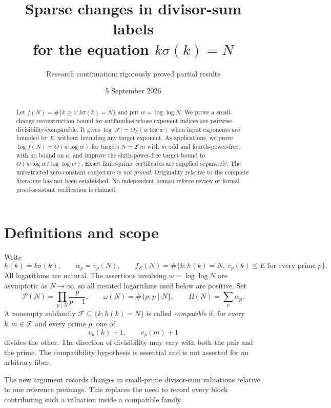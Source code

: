 \documentclass[11pt]{article}
\title{Sparse changes in divisor-sum labels\\for the equation \texorpdfstring{$k\sigma(k)=N$}{k sigma(k)=N}}
\author{Research continuation: rigorously proved partial results}
\date{5 September 2026}
\newcommand{\PP}{\mathcal P}
\newcommand{\FF}{\mathcal F}
\begin{document}
\maketitle
\begin{abstract}
Let $f(N)=\#\{k\ge1:k\sigma(k)=N\}$ and put $w=\log\log N$. We prove a small-change reconstruction bound for subfamilies whose exponent indices are pairwise divisibility-comparable. It gives $\log|\FF|=O_E(w\log w)$ when input exponents are bounded by $E$, without bounding any target exponent. As applications, we prove $\log f(N)=O(w\log w)$ for targets $N=2^a m$ with $m$ odd and fourth-power-free, with no bound on $a$, and improve the sixth-power-free target bound to $O(w\log w/\log\log w)$. Exact finite-prime certificates are supplied separately. The unrestricted zero-constant conjecture is \emph{not proved}. Originality relative to the complete literature has not been established. No independent human referee review or formal proof-assistant verification is claimed.
\end{abstract}

\section{Definitions and scope}
Write
\[
 h(k)=k\sigma(k),\qquad \alpha_p=v_p(N),\qquad
 f_E(N)=\#\{k:h(k)=N,\ v_p(k)\le E\text{ for every prime }p\}.
\]
All logarithms are natural. The assertions involving $w=\log\log N$ are asymptotic as $N\to\infty$, so all iterated logarithms used below are positive. Set
\[
 \PP(N)=\prod_{p\mid N}\frac{p}{p-1},\qquad
 \omega(N)=\#\{p:p\mid N\},\qquad \Omega(N)=\sum_p\alpha_p.
\]
A nonempty subfamily $\FF\subseteq\{k:h(k)=N\}$ is called \emph{compatible} if, for every $k,m\in\FF$ and every prime $p$, one of
\[
 v_p(k)+1,\qquad v_p(m)+1
\]
divides the other. The direction of divisibility may vary with both the pair and the prime. The compatibility hypothesis is essential and is not asserted for an arbitrary fiber.

The new argument records changes in small-prime divisor-sum valuations relative to one reference preimage. This replaces the need to record every block contributing such a valuation inside a compatible family.
\end{document}
